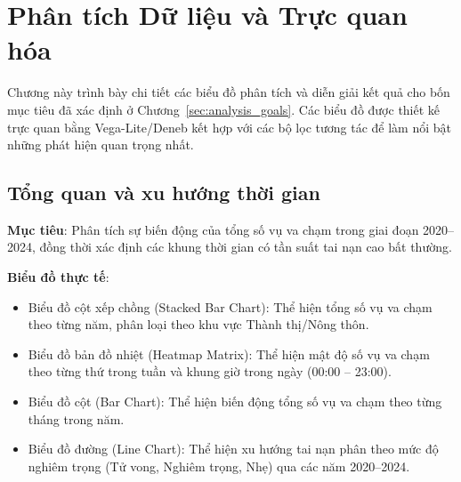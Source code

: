 \section{Phân tích Dữ liệu và Trực quan hóa}
\label{sec:visualization}

Chương này trình bày chi tiết các biểu đồ phân tích và diễn giải kết quả cho bốn mục tiêu đã xác định ở Chương~\ref{sec:analysis_goals}. Các biểu đồ được thiết kế trực quan bằng Vega-Lite/Deneb kết hợp với các bộ lọc tương tác để làm nổi bật những phát hiện quan trọng nhất.

\subsection{Tổng quan và xu hướng thời gian}

\textbf{Mục tiêu}: Phân tích sự biến động của tổng số vụ va chạm trong giai đoạn 2020--2024, đồng thời xác định các khung thời gian có tần suất tai nạn cao bất thường.

\textbf{Biểu đồ thực tế}:
\begin{itemize}
    \item Biểu đồ cột xếp chồng (Stacked Bar Chart): Thể hiện tổng số vụ va chạm theo từng năm, phân loại theo khu vực Thành thị/Nông thôn.
    \item Biểu đồ bản đồ nhiệt (Heatmap Matrix): Thể hiện mật độ số vụ va chạm theo từng thứ trong tuần và khung giờ trong ngày (00:00 -- 23:00).
    \item Biểu đồ cột (Bar Chart): Thể hiện biến động tổng số vụ va chạm theo từng tháng trong năm.
    \item Biểu đồ đường (Line Chart): Thể hiện xu hướng tai nạn phân theo mức độ nghiêm trọng (Tử vong, Nghiêm trọng, Nhẹ) qua các năm 2020--2024.
\end{itemize}

